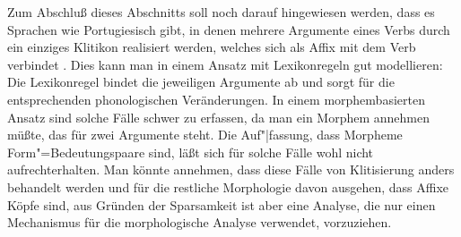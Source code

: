 

Zum Abschluß dieses Abschnitts soll noch darauf hingewiesen werden,
dass es Sprachen wie Portugiesisch gibt, in denen mehrere Argumente eines Verbs
durch ein einziges Klitikon realisiert werden, welches sich als Affix mit dem Verb
verbindet \citep[Kapitel~2.1.1.4 und S.\,169--171]{Crysmann2002a}. 
Dies kann man in einem Ansatz mit Lexikonregeln gut modellieren: Die Lexikonregel bindet die jeweiligen
Argumente ab und sorgt für die entsprechenden phonologischen Veränderungen. In einem morphembasierten
Ansatz sind solche Fälle schwer zu erfassen, da man ein Morphem annehmen müßte, das für zwei Argumente
steht. Die Auf"|fassung, dass Morpheme Form"=Bedeutungspaare sind, läßt sich für solche Fälle wohl nicht
aufrechterhalten.
Man könnte annehmen, dass diese Fälle von Klitisierung anders behandelt werden und für die
restliche Morphologie davon ausgehen, dass Affixe Köpfe sind, aus Gründen der Sparsamkeit ist aber
eine Analyse, die nur einen Mechanismus für die morphologische Analyse verwendet, vorzuziehen.%

